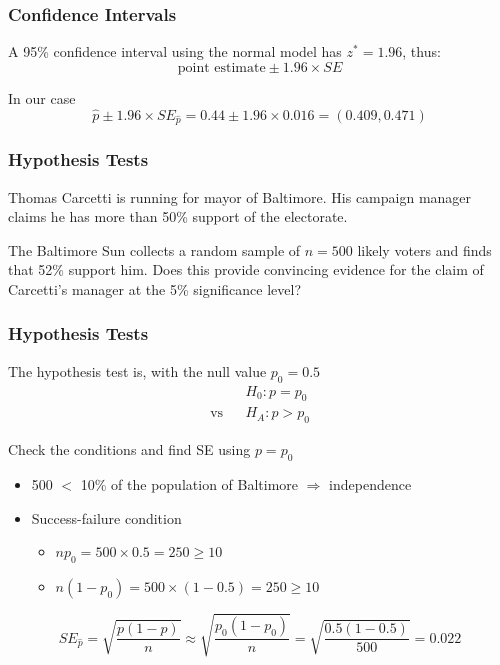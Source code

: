 \documentclass[slides]{beamer}
\newcommand{\blue}[1]{\textcolor{blue2}{#1}}
\newcommand{\phat}{\widehat{p}}
\begin{document}
\begin{frame}[fragile]
\frametitle{Confidence Intervals}

%
%
A 95\% confidence interval using the normal model has $z^*=1.96$, thus:
\[
\mbox{point estimate} \pm 1.96 \times SE
\]

\pause In our case
\[
\phat \pm 1.96\times SE_{\phat} = 0.44 \pm 1.96 \times 0.016 = (0.409, 0.471)
\]

\end{frame}


\begin{frame}[fragile]
\frametitle{Hypothesis Tests}
Thomas Carcetti is running for mayor of Baltimore.  His campaign manager \blue{claims} he has more than 50\% support of the electorate.  

\vspace{0.5cm}

\pause The Baltimore Sun collects a random sample of $n=500$ likely voters and finds that 52\% support him.  Does this provide convincing evidence for the claim of Carcetti's manager at the 5\% significance level?

\end{frame}


\begin{frame}[fragile]
\frametitle{Hypothesis Tests}

%
%
The hypothesis test is, with the null value $p_0=0.5$
\begin{eqnarray*}
&& H_0: p = p_0\\
\mbox{vs}&& H_A: p > p_0 
\end{eqnarray*}

\pause Check the conditions and find SE \blue{using $p=p_0$}
\begin{itemize}
\pause \item 500 $<$ 10\% of the population of Baltimore $\Rightarrow$ independence
\pause \item Success-failure condition 
\begin{itemize}
\item $np_0 = 500 \times 0.5 = 250 \geq 10$
\item $n(1-p_0) = 500 \times (1-0.5) = 250 \geq 10$
\end{itemize}
\end{itemize}
\pause
\[
SE_{\phat} = \sqrt{\frac{p(1-p)}{n}} \approx \sqrt{\frac{p_0(1-p_0)}{n}} = \sqrt{\frac{0.5(1-0.5)}{500}} = 0.022
\]

\end{frame}
\end{document}
